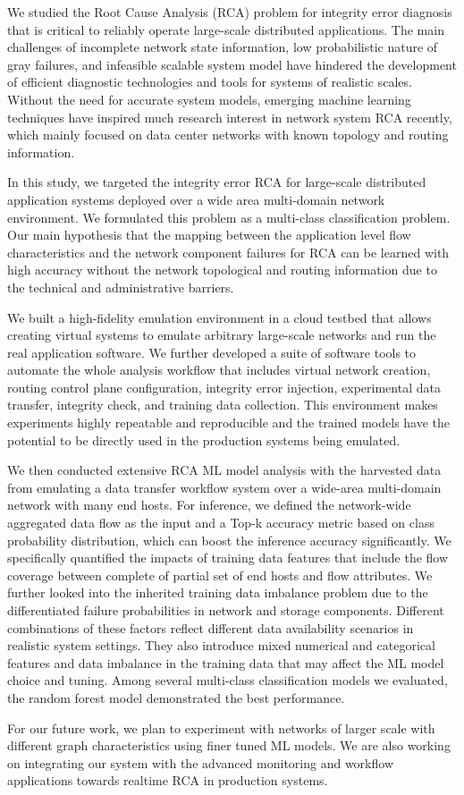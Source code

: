 We studied the Root Cause Analysis (RCA) problem for integrity error diagnosis that is critical to reliably operate large-scale distributed applications. The main challenges of incomplete network state information, low probabilistic nature of gray failures, and infeasible scalable system model have hindered the development of efficient diagnostic technologies and tools for systems of realistic scales. Without the need for accurate system models, emerging machine learning techniques have inspired much research interest in network system RCA recently, which mainly focused on data center networks with known topology and routing information.

In this study, we targeted the integrity error RCA for large-scale distributed application systems deployed over a wide area multi-domain network environment. We formulated this problem as a multi-class classification problem. Our main hypothesis that the mapping between the application level flow characteristics and the network component failures for RCA can be learned with high accuracy without the network topological and routing information due to the technical and administrative barriers. 

We built a high-fidelity emulation environment in a cloud testbed that allows creating virtual systems to emulate arbitrary large-scale networks and run the real application software. We further developed a suite of software tools to automate the whole analysis workflow that includes virtual network creation, routing control plane configuration, integrity error injection, experimental data transfer, integrity check, and training data collection. This environment makes experiments highly repeatable and reproducible and the trained models have the potential to be directly used in the production systems being emulated.

We then conducted extensive RCA ML model analysis with the harvested data from emulating a data transfer workflow system over a wide-area multi-domain network with many end hosts. For inference, we defined the network-wide aggregated data flow as the input and a Top-k accuracy metric based on class probability distribution, which can boost the inference accuracy significantly. We specifically quantified the impacts of training data features that include the flow coverage between complete of partial set of end hosts and flow attributes. We further looked into the inherited training data imbalance problem due to the differentiated failure probabilities in network and storage components. Different combinations of these factors reflect different data availability scenarios in realistic system settings. They also introduce mixed numerical and categorical features and data imbalance in the training data that may affect the ML model choice and tuning.  Among several multi-class classification models we evaluated, the random forest model demonstrated the best performance.

For our future work, we plan to experiment with networks of larger scale with different graph characteristics using finer tuned ML models. We are also working on integrating our system with the advanced monitoring and workflow applications towards realtime RCA in production systems.

